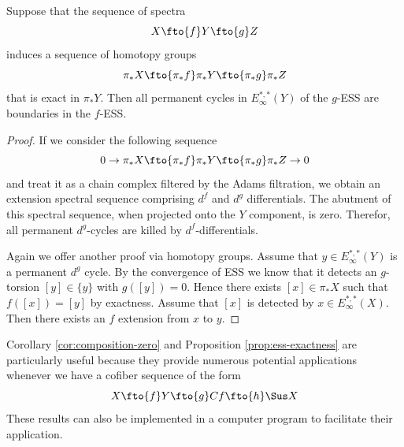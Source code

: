 \begin{proposition}\label{prop:ess-exactness}
    Suppose that the sequence of spectra
    $$X\fto{f}Y\fto{g}Z$$
    induces a sequence of homotopy groups
    $$\pi_*X\fto{\pi_*f}\pi_*Y\fto{\pi_*g}\pi_*Z$$
    that is exact in $\pi_*Y$. Then all permanent cycles in $E^{*,*}_\infty(Y)$ of the $g$-ESS are boundaries in the $f$-ESS.
\end{proposition}

\begin{proof}
    If we consider the following sequence
    \begin{equation}\label{eq:exact-chain}
        0\to \pi_*X\fto{\pi_*f}\pi_*Y\fto{\pi_*g}\pi_*Z\to 0
    \end{equation}
    and treat it as a chain complex filtered by the Adams filtration, we obtain an extension spectral sequence comprising $d^f$ and $d^g$ differentials. The abutment of this spectral sequence, when projected onto the $Y$ component, is zero. Therefor, all permanent $d^g$-cycles are killed by $d^f$-differentials.

    Again we offer another proof via homotopy groups. Assume that $y\in E^{*,*}_\infty(Y)$ is a permanent $d^g$ cycle. By the convergence of ESS we know that it detects an $g$-torsion $[y]\in \{y\}$ with $g([y])=0$. Hence there exists $[x]\in \pi_*X$ such that $f([x])=[y]$ by exactness. Assume that $[x]$ is detected by $x\in E^{*,*}_\infty(X)$. Then there exists an $f$ extension from $x$ to $y$.
\end{proof}

Corollary \ref{cor:composition-zero} and Proposition \ref{prop:ess-exactness} are particularly useful because they provide numerous potential applications whenever we have a cofiber sequence of the form
$$X\fto{f}Y\fto{g}Cf\fto{h}\Sus X$$
These results can also be implemented in a computer program to facilitate their application.


